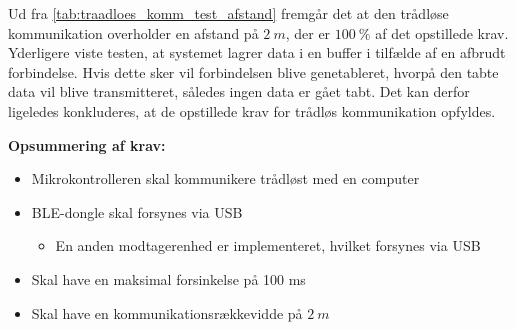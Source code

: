 \noindent
Ud fra \autoref{tab:traadloes_komm_test_afstand} fremgår det at den trådløse kommunikation overholder en afstand på $2~m$, der er $100~\%$ af det opstillede krav. Yderligere viste testen, at systemet lagrer data i en buffer i tilfælde af en afbrudt forbindelse. Hvis dette sker vil forbindelsen blive genetableret, hvorpå den tabte data vil blive transmitteret, således ingen data er gået tabt. Det kan derfor ligeledes konkluderes, at de opstillede krav for trådløs kommunikation opfyldes.
\vspace{3mm}

\textbf{Opsummering af krav:}
\begin{itemize}
\item[\text{\sffamily \checkmark}] Mikrokontrolleren skal kommunikere trådløst med en computer
\item[\text{\sffamily $\div$}] BLE-dongle skal forsynes via USB
\begin{itemize}
\item[\text{\sffamily \checkmark}] En anden modtagerenhed er implementeret, hvilket forsynes via USB
\end{itemize}
\item Skal have en maksimal forsinkelse på 100 ms 
\item[\text{\sffamily \checkmark}] Skal have en kommunikationsrækkevidde på $2~m$
\end{itemize}